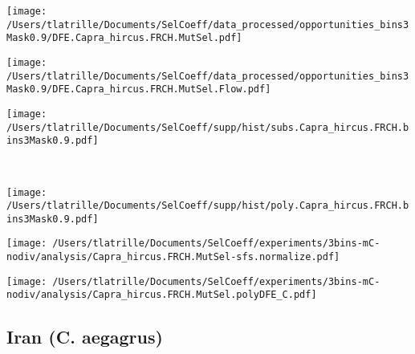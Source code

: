 \documentclass{article}
\begin{document}
    \begin{minipage}{0.32\linewidth}
        \texttt{[image: /Users/tlatrille/Documents/SelCoeff/data\_processed/opportunities\_bins3Mask0.9/DFE.Capra\_hircus.FRCH.MutSel.pdf]}
    \end{minipage}
    \begin{minipage}{0.32\linewidth}
        \texttt{[image: /Users/tlatrille/Documents/SelCoeff/data\_processed/opportunities\_bins3Mask0.9/DFE.Capra\_hircus.FRCH.MutSel.Flow.pdf]}
    \end{minipage}
    \begin{minipage}{0.32\linewidth}
        \texttt{[image: /Users/tlatrille/Documents/SelCoeff/supp/hist/subs.Capra\_hircus.FRCH.bins3Mask0.9.pdf]}
    \end{minipage}
    \\
    \begin{minipage}{0.32\linewidth}
        \texttt{[image: /Users/tlatrille/Documents/SelCoeff/supp/hist/poly.Capra\_hircus.FRCH.bins3Mask0.9.pdf]}
    \end{minipage}
    \begin{minipage}{0.32\linewidth}
        \texttt{[image: /Users/tlatrille/Documents/SelCoeff/experiments/3bins-mC-nodiv/analysis/Capra\_hircus.FRCH.MutSel-sfs.normalize.pdf]}
    \end{minipage}
    \begin{minipage}{0.32\linewidth}
        \texttt{[image: /Users/tlatrille/Documents/SelCoeff/experiments/3bins-mC-nodiv/analysis/Capra\_hircus.FRCH.MutSel.polyDFE\_C.pdf]}
    \end{minipage}
    \subsection{Iran (C. aegagrus)}
\end{document}
